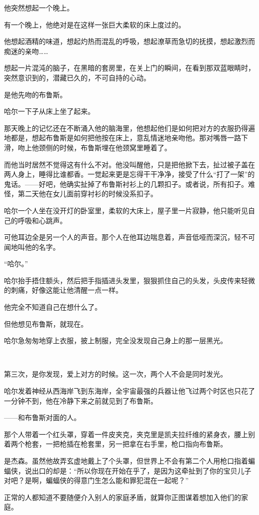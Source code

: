 \documentclass[../main.tex]{subfiles}
\begin{document}
他突然想起一个晚上。

有一个晚上，他绝对是在这样一张巨大柔软的床上度过的。

他想起酒精的味道，想起灼热而混乱的呼吸，想起潦草而急切的抚摸，想起激烈而痴迷的亲吻……

想起一片混沌的脑子，在黑暗的套房里，在关上门的瞬间，在看到那双蓝眼睛时，突然意识到的，潜藏已久的，不可自持的心动。

是他先吻的布鲁斯。

哈尔一下子从床上坐了起来。

那天晚上的记忆还在不断涌入他的脑海里，他想起他们是如何把对方的衣服扔得遍地都是，想起布鲁斯是如何把他按在床上，意乱情迷地亲吻他。那对嘴唇一路下滑，吻上他颈侧的时候，布鲁斯埋在他颈窝里睡着了。

而他当时居然不觉得这有什么不对。他没叫醒他，只是把他掀下去，扯过被子盖在两人身上，睡得比谁都香。一觉起来更是忘得干干净净，接受了什么“打了一架”的鬼话。——好吧，他确实扯掉了布鲁斯衬衫上的几颗扣子。或者说，所有扣子。难怪，第二天他在女儿面前穿衬衫的时候没系扣子。

哈尔一个人坐在没开灯的卧室里，柔软的大床上，屋子里一片寂静，他只能听见自己的呼吸和心跳声。

可他耳边全是另一个人的声音。那个人在他耳边喘息着，声音低哑而深沉，轻不可闻地叫他的名字。

“哈尔。”

哈尔抬手捂住额头，然后把手指插进头发里，狠狠抓住自己的头发，头皮传来轻微的刺痛，好像这能让他清醒一点一样。

他完全不知道自己在想什么了。

但他想见布鲁斯，就现在。

哈尔急匆匆地穿上衣服，披上制服，完全没发现自己身上的那一层黑光。

~\

第三次，是你发现，爱上对方的时候。这一次，两个人不会是同时发光。

哈尔发着神经从西海岸飞到东海岸，全宇宙最强的兵器让他飞过两个时区也只花了一分钟不到，他在冷静下来之前就见到了布鲁斯。

——和布鲁斯对面的人。

那个人带着一个红头罩，穿着一件皮夹克，夹克里是凯夫拉纤维的紧身衣，腰上别着两个枪套，一把枪插在枪套里，另一把拿在右手里，枪口指向布鲁斯。

是杰森。虽然他故弄玄虚地戴上了个头罩，但世界上不会有第二个人用枪口指着蝙蝠侠，说出口的却是：“所以你现在开始在乎了，是因为这牵扯到了你的宝贝儿子对吧？是啊，蝙蝠侠的得意门生怎么能和罪犯混在一起呢？”

正常的人都知道不要随便介入别人的家庭矛盾，就算你正图谋着想加入他们的家庭。
\end{document}
